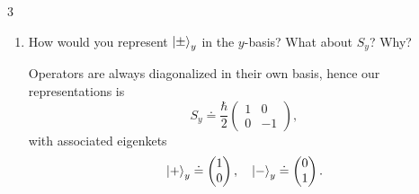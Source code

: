 \documentclass[11pt]{article}
\begin{document}
\begin{problem}{3}
\begin{enumerate}[label=(\alph*)]
\begin{answer}
\begin{equation}
\begin{aligned}
\begin{pmatrix}
0  & -2i \\
2i & 0
 \end{pmatrix}.
                \end{aligned}
            \end{equation}
            Simplifying, we thus have the expected result
            \begin{equation}
            \label{eq:17}
            S_y^{\prime} \doteq \frac{\hbar}{2} \begin{pmatrix}
0  & -i \\
i  & 0
 \end{pmatrix}.
            \end{equation}
          \end{answer}
    \item How would you represent \( \ket{\pm}_y \) in the \( y \)-basis?
          What about \( S_y \)?
          Why?
          \begin{answer}
            Operators are always diagonalized in their own basis, hence our representations is
            \begin{equation}
            \label{eq:18}
            S_y \doteq \frac{\hbar}{2} \begin{pmatrix}
1  & 0 \\
0  & -1
 \end{pmatrix}
 ,
\end{equation}
with associated eigenkets
\begin{equation}
\label{eq:19}
\ket{+}_y \doteq \begin{pmatrix}
1 \\
0
 \end{pmatrix}
 , \quad \ket{-}_y \doteq \begin{pmatrix}
0 \\
1
 \end{pmatrix}.
\end{equation}
          \end{answer}
  \end{enumerate}
\end{problem}
\end{document}
